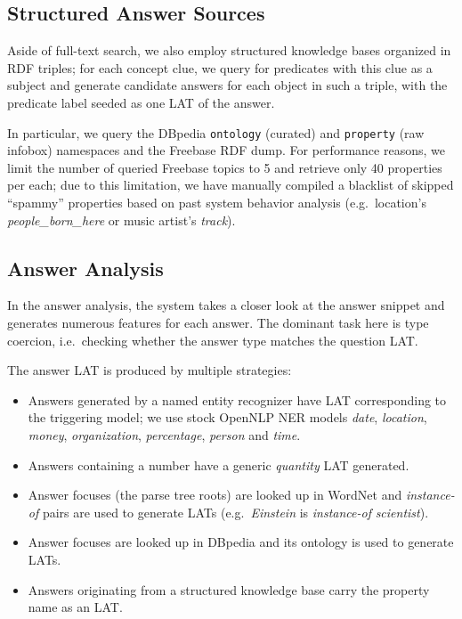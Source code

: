 \subsection{Structured Answer Sources}

Aside of full-text search, we also employ structured knowledge bases organized in RDF triples;
for each concept clue, we query for predicates with this clue as a subject
and generate candidate answers for each object in such a triple, with the predicate label seeded as one LAT of the answer.

In particular, we query the DBpedia \texttt{ontology} (curated) and \texttt{property} (raw infobox)
namespaces and the Freebase RDF dump.
For performance reasons, we limit the number of queried Freebase topics to 5 and retrieve only 40 properties per each;
due to this limitation, we have manually compiled a blacklist of skipped
``spammy'' properties based on past system behavior analysis
(e.g.\ location's \textit{people\_born\_here} or music artist's \textit{track}).

\subsection{Answer Analysis}

In the answer analysis, the system takes a closer look at the answer snippet
and generates numerous features for each answer.
The dominant task here is type coercion,
i.e.\ checking whether the answer type matches the question LAT.

The answer LAT is produced by multiple strategies:
\begin{itemize}
	\item Answers generated by a named entity recognizer have LAT corresponding to the triggering model;
		we use stock OpenNLP NER models \textit{date}, \textit{location}, \textit{money}, \textit{organization}, \textit{percentage}, \textit{person} and \textit{time}.
	\item Answers containing a number have a generic \textit{quantity} LAT generated.
	\item Answer focuses (the parse tree roots) are looked up in WordNet and \textit{instance-of} pairs are used to generate LATs (e.g.\ \textit{Einstein} is \textit{instance-of} \textit{scientist}).
	\item Answer focuses are looked up in DBpedia and its ontology is used to generate LATs.
	\item Answers originating from a structured knowledge base carry the property name as an LAT.
\end{itemize}

